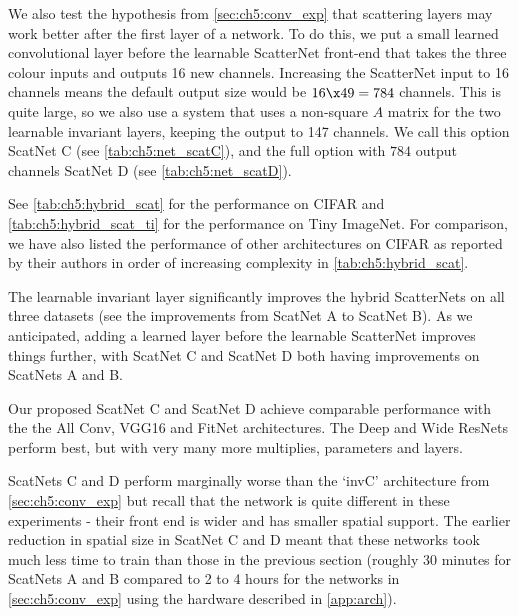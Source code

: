 We also test the hypothesis from \autoref{sec:ch5:conv_exp} that scattering layers may 
work better after the first layer of a network. To do this, we put a small
learned convolutional layer before the learnable ScatterNet front-end that takes the
three colour inputs and outputs 16 new channels. Increasing the ScatterNet input
to 16 channels means the default output size would be $16\x 49=784$ channels.
This is quite large, so we also use a system that uses a non-square $A$ matrix
for the two learnable invariant layers, keeping the output to 147 channels. We call this
option ScatNet C (see \autoref{tab:ch5:net_scatC}), and the full option with 
$784$ output channels ScatNet D (see \autoref{tab:ch5:net_scatD}). 



See
\autoref{tab:ch5:hybrid_scat} for the performance on CIFAR and
\autoref{tab:ch5:hybrid_scat_ti} for the performance on Tiny ImageNet.
For comparison, we have also listed the performance of other architectures on
CIFAR as reported by their authors in order of increasing complexity in
\autoref{tab:ch5:hybrid_scat}. 

The learnable invariant layer significantly improves the hybrid ScatterNets on
all three datasets (see the improvements from ScatNet A to ScatNet B).
As we anticipated, adding a learned layer before the learnable ScatterNet
improves things further, with ScatNet C and ScatNet D both having improvements on
ScatNets A and B.

Our proposed ScatNet C and ScatNet D achieve
comparable performance with the the All Conv, VGG16 and FitNet architectures.
The Deep\cite{he_deep_2016} and Wide\cite{zagoruyko_wide_2016} ResNets perform
best, but with very many more multiplies, parameters and layers.

ScatNets C and D perform marginally worse than the `invC' architecture from
\autoref{sec:ch5:conv_exp} but recall that the network is
quite different in these experiments - their front end is wider and has smaller
spatial support. The earlier reduction in spatial size in ScatNet C and D
meant that these networks took much less time to train
than those in the previous section (roughly 30 minutes for ScatNets A and B
compared to 2 to 4 hours for the networks in \autoref{sec:ch5:conv_exp} using
the hardware described in \autoref{app:arch}).


